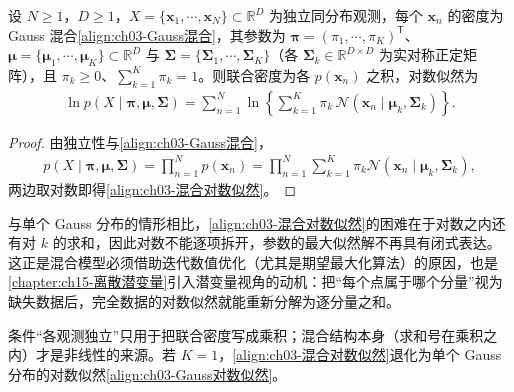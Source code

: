 \documentclass[../../main.tex]{subfiles}
\begin{document}
\begin{proposition}[混合密度的对数似然]\label{proposition:ch03-混合对数似然}
设 $N\geqslant1$，$D\geqslant1$，$X=\{\boldsymbol{x}_1,\cdots,\boldsymbol{x}_N\}\subset\mathbb{R}^{D}$ 为独立同分布观测，每个 $\boldsymbol{x}_n$ 的密度为 Gauss 混合\eqref{align:ch03-Gauss混合}，其参数为 $\boldsymbol{\pi}=(\pi_1,\cdots,\pi_K)^{\mathsf{T}}$、$\boldsymbol{\mu}=\{\boldsymbol{\mu}_1,\cdots,\boldsymbol{\mu}_K\}\subset\mathbb{R}^{D}$ 与 $\boldsymbol{\Sigma}=\{\boldsymbol{\Sigma}_1,\cdots,\boldsymbol{\Sigma}_K\}$（各 $\boldsymbol{\Sigma}_k\in\mathbb{R}^{D\times D}$ 为实对称正定矩阵），且 $\pi_k\geqslant0$、$\sum_{k=1}^{K}\pi_k=1$。则联合密度为各 $p(\boldsymbol{x}_n)$ 之积，对数似然为
\begin{align}
\ln p(X\mid\boldsymbol{\pi},\boldsymbol{\mu},\boldsymbol{\Sigma})=\sum_{n=1}^{N}\ln\left\{\sum_{k=1}^{K}\pi_{k}\,\mathcal{N}(\boldsymbol{x}_n\mid\boldsymbol{\mu}_{k},\boldsymbol{\Sigma}_{k})\right\}.
\label{align:ch03-混合对数似然}
\end{align}
\end{proposition}
\begin{proof}
由独立性与\eqref{align:ch03-Gauss混合}，
\begin{align*}
p(X\mid\boldsymbol{\pi},\boldsymbol{\mu},\boldsymbol{\Sigma})=\prod_{n=1}^{N}p(\boldsymbol{x}_n)=\prod_{n=1}^{N}\sum_{k=1}^{K}\pi_{k}\mathcal{N}(\boldsymbol{x}_n\mid\boldsymbol{\mu}_k,\boldsymbol{\Sigma}_k),
\end{align*}
两边取对数即得\eqref{align:ch03-混合对数似然}。
\end{proof}

\begin{remark}
与单个 Gauss 分布的情形相比，\eqref{align:ch03-混合对数似然}的困难在于对数之内还有对 $k$ 的求和，因此对数不能逐项拆开，参数的最大似然解不再具有闭式表达。这正是混合模型必须借助迭代数值优化（尤其是期望最大化算法）的原因，也是\cref{chapter:ch15-离散潜变量}引入潜变量视角的动机：把“每个点属于哪个分量”视为缺失数据后，完全数据的对数似然就能重新分解为逐分量之和。

条件“各观测独立”只用于把联合密度写成乘积；混合结构本身（求和号在乘积之内）才是非线性的来源。若 $K=1$，\eqref{align:ch03-混合对数似然}退化为单个 Gauss 分布的对数似然\eqref{align:ch03-Gauss对数似然}。
\end{remark}
\end{document}
